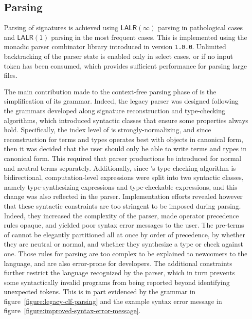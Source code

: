 
\subsection{Parsing}

Parsing of \Beluga signatures is achieved using $ \mathsf{LALR(\infty)} $ parsing in pathological cases and $ \mathsf{LALR(1)} $ parsing in the most frequent cases.
This is implemented using the monadic parser combinator library introduced in \Beluga version \texttt{1.0.0}.
Unlimited backtracking of the parser state is enabled only in select cases, or if no input token has been consumed, which provides sufficient performance for parsing large \Beluga files.

The main contribution made to the context-free parsing phase of \Beluga is the simplification of its grammar.
Indeed, the legacy parser was designed following the grammars developed along signature reconstruction and type-checking algorithms, which introduced syntactic classes that ensure some properties always hold.
Specifically, the index level \LF of \Beluga is strongly-normalizing, and since reconstruction for \LF terms and types operates best with objects in canonical form, then it was decided that the user should only be able to write \LF terms and types in canonical form.
This required that parser productions be introduced for normal and neutral terms separately.
Additionally, since \Beluga's type-checking algorithm is bidirectional, computation-level expressions were split into two syntactic classes, namely type-synthesizing expressions and type-checkable expressions, and this change was also reflected in the parser.
Implementation efforts revealed however that these syntactic constraints are too stringent to be imposed during parsing.
Indeed, they increased the complexity of the parser, made operator precedence rules opaque, and yielded poor syntax error messages to the user.
The pre-terms of \Beluga cannot be elegantly partitioned all at once by order of precedence, by whether they are neutral or normal, and whether they synthesize a type or check against one.
Those rules for parsing are too complex to be explained to newcomers to the language, and are also error-prone for developers.
The additional constraints further restrict the language recognized by the parser, which in turn prevents some syntactically invalid programs from being reported beyond identifying unexpected tokens.
This is in part evidenced by the grammar in figure~\ref{figure:legacy-clf-parsing} and the example syntax error message in figure~\ref{figure:improved-syntax-error-message}.

